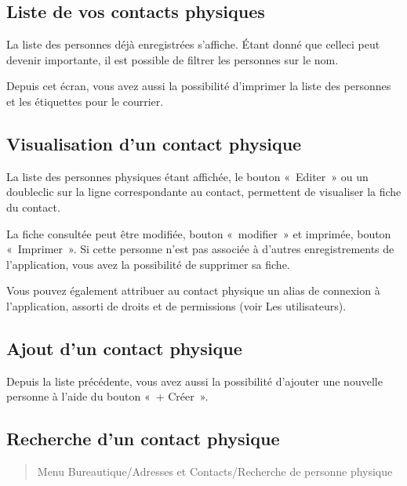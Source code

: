 \documentclass[a4paper,10pt,oneside,french]{sphinxmanual}
\begin{document}
\subsection{Liste de vos contacts physiques}
\label{\detokenize{contacts/individual:liste-de-vos-contacts-physiques}}
\sphinxAtStartPar
La liste des personnes déjà enregistrées s’affiche. Étant donné que celle\sphinxhyphen{}ci peut devenir importante, il est possible de filtrer les personnes sur le nom.

\sphinxAtStartPar
Depuis cet écran, vous avez aussi la possibilité d’imprimer la liste des personnes et les étiquettes pour le courrier.

\noindent{}


\subsection{Visualisation d’un contact physique}
\label{\detokenize{contacts/individual:visualisation-d-un-contact-physique}}
\sphinxAtStartPar
La liste des personnes physiques étant affichée, le bouton « Editer » ou un double\sphinxhyphen{}clic sur la ligne correspondante au contact, permettent de visualiser la fiche du contact.

\noindent{}

\sphinxAtStartPar
La fiche consultée peut être modifiée, bouton « modifier » et imprimée, bouton « Imprimer ».
Si cette personne n’est pas associée à d’autres enregistrements de l’application, vous avez la possibilité de supprimer sa fiche.

\sphinxAtStartPar
Vous pouvez également attribuer au contact physique un alias de connexion à l’application, assorti de droits et de permissions (voir Les utilisateurs).

\noindent{}


\subsection{Ajout d’un contact physique}
\label{\detokenize{contacts/individual:ajout-d-un-contact-physique}}
\sphinxAtStartPar
Depuis la liste précédente, vous avez aussi la possibilité d’ajouter une nouvelle personne à l’aide du bouton « + Créer ».

\noindent{}


\subsection{Recherche d’un contact physique}
\label{\detokenize{contacts/individual:recherche-d-un-contact-physique}}\begin{quote}

\sphinxAtStartPar
Menu Bureautique/Adresses et Contacts/Recherche de personne physique
\end{quote}
\end{document}
